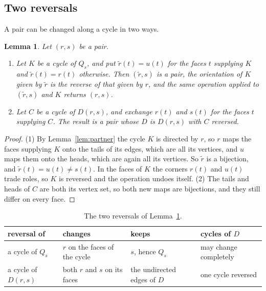 \documentclass[10pt]{amsart}
\numberwithin{equation}{section}
\newtheorem{lemma}[equation]{Lemma}
\theoremstyle{definition}
\theoremstyle{remark}
\newcommand{\Dc}{D}
\begin{document}
\subsection*{Two reversals}
A pair can be changed along a cycle in two ways.

\begin{lemma}\label{lem:reversals}
Let $(r,s)$ be a pair.
\begin{enumerate}
\item Let $K$ be a cycle of $Q_s$, and put $\tilde r(t)=u(t)$ for the faces $t$ supplying $K$ and $\tilde r(t)=r(t)$ otherwise.
Then $(\tilde r,s)$ is a pair, the orientation of $K$ given by $\tilde r$ is the reverse of that given by $r$, and the same operation applied to $(\tilde r,s)$ and $K$ returns $(r,s)$.
\item Let $C$ be a cycle of $\Dc(r,s)$, and exchange $r(t)$ and $s(t)$ for the faces $t$ supplying $C$.
The result is a pair whose $\Dc$ is $\Dc(r,s)$ with $C$ reversed.
\end{enumerate}
\end{lemma}

\begin{proof}
(1) By Lemma~\ref{lem:partner} the cycle $K$ is directed by $r$, so $r$ maps the faces supplying $K$ onto the tails of its edges, which are all its vertices, and $u$ maps them onto the heads, which are again all its vertices.
So $\tilde r$ is a bijection, and $\tilde r(t)=u(t)\neq s(t)$.
In the faces of $K$ the corners $r(t)$ and $u(t)$ trade roles, so $K$ is reversed and the operation undoes itself.
(2) The tails and heads of $C$ are both its vertex set, so both new maps are bijections, and they still differ on every face.
\end{proof}

\begin{table}[ht]
\centering
\begin{tabular}{@{}llll@{}}
\toprule
reversal of & changes & keeps & cycles of $\Dc$ \\
\midrule
a cycle of $Q_s$ & $r$ on the faces of the cycle & $s$, hence $Q_s$ & may change completely\\
a cycle of $\Dc(r,s)$ & both $r$ and $s$ on its faces & the undirected edges of $\Dc$ & one cycle reversed\\
\bottomrule
\end{tabular}
\caption{The two reversals of Lemma~\ref{lem:reversals}.}
\label{tab:reversals}
\end{table}
\end{document}
